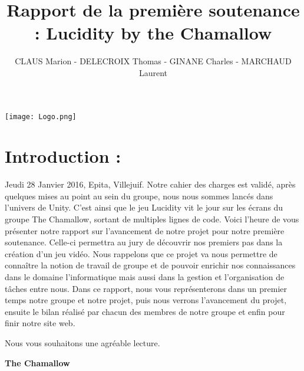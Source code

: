 \documentclass[a4paper]{article}
\begin{document}
\large
\begin{titlepage}
		\title{Rapport de la première soutenance : Lucidity by the Chamallow}
		
		\author{CLAUS Marion -  DELECROIX Thomas - GINANE Charles - MARCHAUD Laurent} 

		
\end{titlepage}


\pagestyle{fancy}
\renewcommand{\footrulewidth}{0.4pt}

 \begin{titlepage}
\centering
\maketitle
\texttt{[image: Logo.png]}

  \end{titlepage}

\tableofcontents 

\newpage

\section{Introduction :}

\quad

Jeudi 28 Janvier 2016, Epita, Villejuif. Notre cahier des charges est validé, après quelques mises au point au sein du groupe, nous nous sommes lancés dans l'univers de Unity. C'est ainsi que le jeu Lucidity vit le jour sur les écrans du groupe The Chamallow, sortant de multiples lignes de code. 
Voici l'heure de vous présenter notre rapport sur l'avancement de notre projet pour notre première soutenance. Celle-ci permettra au jury de découvrir nos premiers pas dans la création d'un jeu vidéo.
Nous rappelons que ce projet va nous permettre de connaître la notion de travail de groupe et de pouvoir enrichir nos connaissances dans le domaine l’informatique mais aussi dans la gestion et l’organisation de tâches entre nous.
Dans ce rapport, nous vous représenterons dans un premier temps notre groupe et notre projet, puis nous verrons l'avancement du projet, ensuite le bilan réalisé par chacun des membres de notre groupe et enfin pour finir notre site web.

Nous vous souhaitons une agréable lecture.

\quad

\quad 


\begin{center}

\textbf{The Chamallow}

\end{center}
\end{document}
